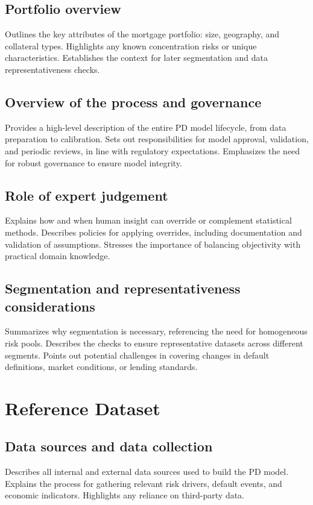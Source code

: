 \documentclass[12pt,a4paper]{article}
\begin{document}
\subsection{Portfolio overview}
Outlines the key attributes of the mortgage portfolio: size, geography, and collateral types. Highlights any known concentration risks or unique characteristics. Establishes the context for later segmentation and data representativeness checks.

\subsection{Overview of the process and governance}
Provides a high-level description of the entire PD model lifecycle, from data preparation to calibration. Sets out responsibilities for model approval, validation, and periodic reviews, in line with regulatory expectations. Emphasizes the need for robust governance to ensure model integrity.

\subsection{Role of expert judgement}
Explains how and when human insight can override or complement statistical methods. Describes policies for applying overrides, including documentation and validation of assumptions. Stresses the importance of balancing objectivity with practical domain knowledge.

\subsection{Segmentation and representativeness considerations}
Summarizes why segmentation is necessary, referencing the need for homogeneous risk pools. Describes the checks to ensure representative datasets across different segments. Points out potential challenges in covering changes in default definitions, market conditions, or lending standards.

\section{Reference Dataset}

\subsection{Data sources and data collection}
Describes all internal and external data sources used to build the PD model. Explains the process for gathering relevant risk drivers, default events, and economic indicators. Highlights any reliance on third-party data.
\end{document}
